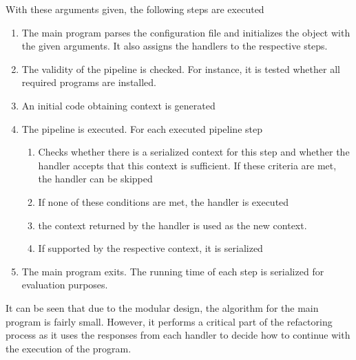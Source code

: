 With these arguments given, the following steps are executed

\begin{enumerate}
    \item The main program parses the configuration file and initializes the object with the given arguments. It also assigns the handlers to the respective steps.
    \item  The validity of the pipeline is checked. For instance, it is tested whether all required programs are installed.
    \item An initial code obtaining context is generated
    \item The pipeline is executed. For each executed pipeline step
    \begin{enumerate}
        \item Checks whether there is a serialized context for this step and whether the handler accepts that this context is sufficient. If these criteria are met, the handler can be skipped
        \item If none of these conditions are met, the handler is executed
        \item the context returned by the handler is used as the new context.
        \item If supported by the respective context, it is serialized
    \end{enumerate}
    \item The main program exits. The running time of each step is serialized for evaluation purposes. 
\end{enumerate}

It can be seen that due to the modular design, the algorithm for the main program is fairly small. However, it performs a critical part of the refactoring process as it uses the responses from each handler to decide how to continue with the execution of the program. 